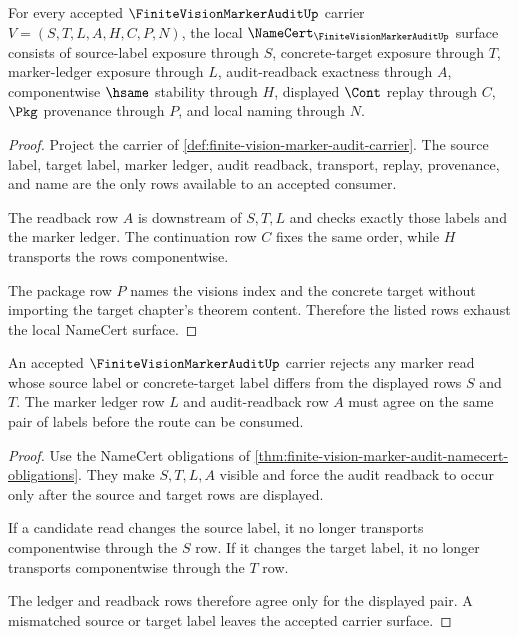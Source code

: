 \begin{theorem}
\label{thm:finite-vision-marker-audit-namecert-obligations}
For every accepted $\FiniteVisionMarkerAuditUp$ carrier $V=(S,T,L,A,H,C,P,N)$, the local $\NameCert_{\FiniteVisionMarkerAuditUp}$ surface consists of source-label exposure through $S$, concrete-target exposure through $T$, marker-ledger exposure through $L$, audit-readback exactness through $A$, componentwise $\hsame$ stability through $H$, displayed $\Cont$ replay through $C$, $\Pkg$ provenance through $P$, and local naming through $N$.
\end{theorem}
\begin{proof}
Project the carrier of \autoref{def:finite-vision-marker-audit-carrier}. The source label, target label, marker ledger, audit readback, transport, replay, provenance, and name are the only rows available to an accepted consumer.

The readback row $A$ is downstream of $S,T,L$ and checks exactly those labels and the marker ledger. The continuation row $C$ fixes the same order, while $H$ transports the rows componentwise.

The package row $P$ names the visions index and the concrete target without importing the target chapter's theorem content. Therefore the listed rows exhaust the local NameCert surface.
\end{proof}

\begin{theorem}
\label{thm:finite-vision-marker-audit-readback-failure}
An accepted $\FiniteVisionMarkerAuditUp$ carrier rejects any marker read whose source label or concrete-target label differs from the displayed rows $S$ and $T$. The marker ledger row $L$ and audit-readback row $A$ must agree on the same pair of labels before the route can be consumed.
\end{theorem}
\begin{proof}
Use the NameCert obligations of \autoref{thm:finite-vision-marker-audit-namecert-obligations}. They make $S,T,L,A$ visible and force the audit readback to occur only after the source and target rows are displayed.

If a candidate read changes the source label, it no longer transports componentwise through the $S$ row. If it changes the target label, it no longer transports componentwise through the $T$ row.

The ledger and readback rows therefore agree only for the displayed pair. A mismatched source or target label leaves the accepted carrier surface.
\end{proof}

